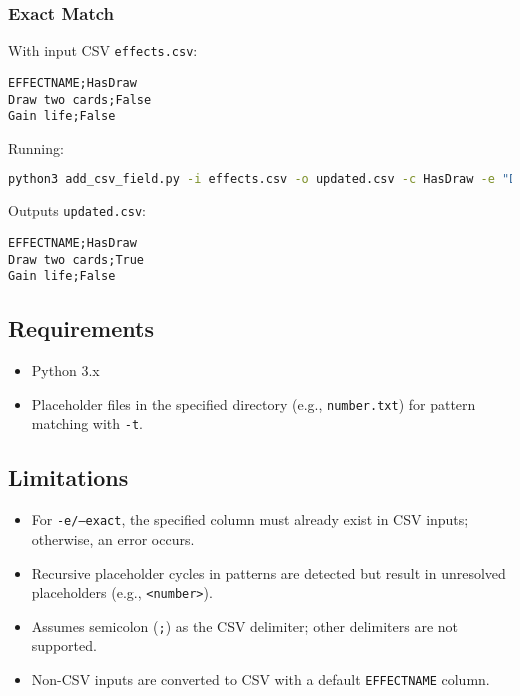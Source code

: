 \subsubsection{Exact Match}
With input CSV \texttt{effects.csv}:
\begin{lstlisting}
EFFECTNAME;HasDraw
Draw two cards;False
Gain life;False
\end{lstlisting}
Running:
\begin{lstlisting}[language=bash]
python3 add_csv_field.py -i effects.csv -o updated.csv -c HasDraw -e "Draw two"
\end{lstlisting}
Outputs \texttt{updated.csv}:
\begin{lstlisting}
EFFECTNAME;HasDraw
Draw two cards;True
Gain life;False
\end{lstlisting}

\subsection{Requirements}
\begin{itemize}
    \item Python 3.x
    \item Placeholder files in the specified directory (e.g., \texttt{number.txt}) for pattern matching with \texttt{-t}.
\end{itemize}

\subsection{Limitations}
\begin{itemize}
    \item For \texttt{-e/--exact}, the specified column must already exist in CSV inputs; otherwise, an error occurs.
    \item Recursive placeholder cycles in patterns are detected but result in unresolved placeholders (e.g., \texttt{<number>}).
    \item Assumes semicolon (\texttt{;}) as the CSV delimiter; other delimiters are not supported.
    \item Non-CSV inputs are converted to CSV with a default \texttt{EFFECTNAME} column.
\end{itemize}














